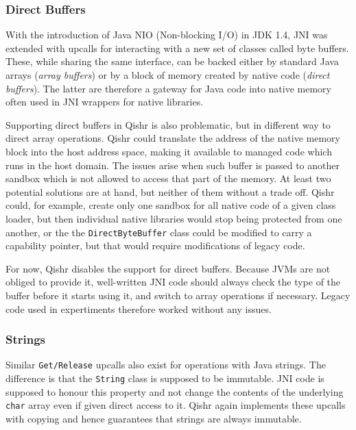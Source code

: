 \documentclass[a4paper,12pt,twoside,openright]{report}
\newcommand{\class}[1]{\texttt{#1}}
\begin{document}
\subsubsection{Direct Buffers}
\label{sec:DirectBuffers}

With the introduction of Java NIO (Non-blocking I/O) in JDK 1.4, JNI was extended with upcalls for interacting with a new set of classes called byte buffers. These, while sharing the same interface, can be backed either by standard Java arrays (\emph{array buffers}) or by a block of memory created by native code (\emph{direct buffers}). The latter are therefore a gateway for Java code into native memory often used in JNI wrappers for native libraries.

Supporting direct buffers in Qishr is also problematic, but in different way to direct array operations. Qishr could translate the address of the native memory block into the host address space, making it available to managed code which runs in the host domain. The issues arise when such buffer is passed to another sandbox which is not allowed to access that part of the memory. At least two potential solutions are at hand, but neither of them without a trade off. Qishr could, for example, create only one sandbox for all native code of a given class loader, but then individual native libraries would stop being protected from one another, or the the \class{DirectByteBuffer} class could be modified to carry a capability pointer, but that would require modifications of legacy code.

For now, Qishr disables the support for direct buffers. Because JVMs are not obliged to provide it, well-written JNI code should always check the type of the buffer before it starts using it, and switch to array operations if necessary. Legacy code used in expertiments therefore worked without any issues.

\subsubsection{Strings}

Similar \texttt{Get/Release} upcalls also exist for operations with Java strings. The difference is that the \class{String} class is supposed to be immutable. JNI code is supposed to honour this property and not change the contents of the underlying \class{char} array even if given direct access to it. Qishr again implements these upcalls with copying and hence guarantees that strings are always immutable.
\end{document}

